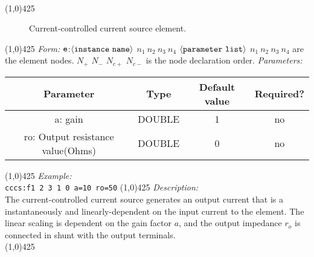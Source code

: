\documentclass{article}
\begin{document}
\\
\hrulefill \linethickness{0.5mm}\line(1,0){425}
\normalsize
\newline
\begin{figure}[h]
\centerline{\epsfxsize=4in}
\caption{Current-controlled current source element.}
\end{figure}
\newline
\linethickness{0.5mm} \line(1,0){425}
\newline
\textit{Form:}
\newline
$\tt e$:$\langle \tt{instance\ name}\rangle$ $n_1\ n_2\ n_3\ n_4$
$\langle \tt{parameter\ list}\rangle$
\newline
$n_1\ n_2\ n_3\ n_4$ are the element nodes.
\newline 
$N_+$ $N_-$ $N_{c+}$ $N_{c-}$ is the node declaration order.
\newline
\textit{Parameters:}
\begin{table}[H]
\begin{tabular}{|c|c|c|c|}
\hline
Parameter&Type&Default value&Required?\\
\hline
a: gain & DOUBLE & 1 & no\\
\hline
ro: Output resistance value(Ohms) & DOUBLE & 0 & no\\
\hline
\end{tabular}
\end{table}
\linethickness{0.5mm} \line(1,0){425}
\newline
\textit{Example:}\\
\newline
\texttt{cccs:f1 2 3 1 0 a=10 ro=50}
\newline
\linethickness{0.5mm} \line(1,0){425}
\newline
\textit{Description:}\\
The current-controlled current source generates an output current
that is a instantaneously and linearly-dependent on the input
current to the element.  The linear scaling is dependent on the 
gain factor $a$, and the output impedance $r_o$ is connected in
shunt with the output terminals.\\
\newline
\linethickness{0.5mm} \line(1,0){425}
\end{document}
